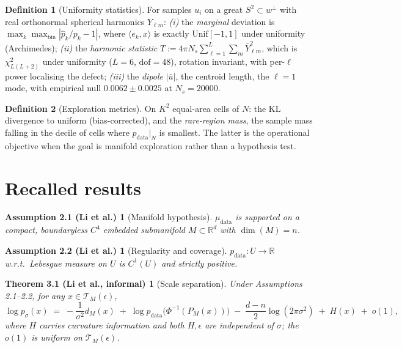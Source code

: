 \documentclass[10pt]{article}
\theoremstyle{definition}
\newtheorem{definition}{Definition}
\theoremstyle{plain}
\newtheorem*{thmA}{Theorem 3.1 (Li et al., informal)}
\newtheorem*{asmA}{Assumption 2.1 (Li et al.)}
\newtheorem*{asmB}{Assumption 2.2 (Li et al.)}
\newcommand{\pdata}{p_{\mathrm{data}}}
\newcommand{\mdata}{\mu_{\mathrm{data}}}
\newcommand{\R}{\mathbb{R}}
\newcommand{\TM}{\mathcal{T}_M}
\newcommand{\dM}{d_M}
\begin{document}
\begin{definition}[Uniformity statistics]
For samples $u_i$ on a great $S^2 \subset w^\perp$ with real orthonormal
spherical harmonics $Y_{\ell m}$:
\emph{(i)} the \emph{marginal} deviation is
$\max_k \max_{\text{bin}} |\hat p_k/p_k - 1|$, where $\langle e_k, x\rangle$ is
exactly $\mathrm{Unif}[-1,1]$ under uniformity (Archimedes);
\emph{(ii)} the \emph{harmonic statistic}
$T := 4\pi N_s \sum_{\ell=1}^{L}\sum_{m} \bar{Y}_{\ell m}^2$, which is
$\chi^2_{L(L+2)}$ under uniformity ($L=6$, $\mathrm{dof}=48$), rotation
invariant, with per-$\ell$ power localising the defect;
\emph{(iii)} the \emph{dipole} $|\bar{u}|$, the centroid length, the $\ell=1$
mode, with empirical null $0.0062 \pm 0.0025$ at $N_s = 20000$.
\end{definition}

\begin{definition}[Exploration metrics]
On $K^2$ equal-area cells of $N$: the KL divergence to uniform (bias-corrected),
and the \emph{rare-region mass}, the sample mass falling in the decile of cells
where $\pdata|_N$ is smallest. The latter is the operational objective when the
goal is manifold exploration rather than a hypothesis test.
\end{definition}

\section{Recalled results}

\begin{asmA}[Manifold hypothesis]
$\mdata$ is supported on a compact, boundaryless $C^4$ embedded submanifold
$M \subset \R^d$ with $\dim(M) = n$.
\end{asmA}

\begin{asmB}[Regularity and coverage]
$\pdata : U \to \R$ w.r.t.\ Lebesgue measure on $U$ is $C^1(U)$ and strictly
positive.
\end{asmB}

\begin{thmA}[Scale separation]
Under Assumptions 2.1--2.2, for any $x \in \TM(\epsilon)$,
\begin{equation}
\log p_\sigma(x) \;=\; -\frac{1}{\sigma^2}\dM(x)
  \;+\; \log \pdata\big(\Phi^{-1}(P_M(x))\big)
  \;-\; \frac{d-n}{2}\log(2\pi\sigma^2) \;+\; H(x) \;+\; o(1),
\label{eq:expansion}
\end{equation}
where $H$ carries curvature information and both $H,\epsilon$ are independent of
$\sigma$; the $o(1)$ is uniform on $\TM(\epsilon)$.
\end{thmA}
\end{document}
